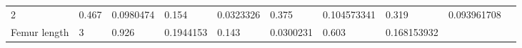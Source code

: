 \documentclass[11pt]{article}
\begin{document}
\begin{longtable}[]{@{}llllllllll@{}}
\begin{minipage}[t]{0.07\columnwidth}
2\strut
\end{minipage} & \begin{minipage}[t]{0.07\columnwidth}\raggedright
0.467\strut
\end{minipage} & \begin{minipage}[t]{0.07\columnwidth}\raggedright
0.0980474\strut
\end{minipage} & \begin{minipage}[t]{0.07\columnwidth}\raggedright
0.154\strut
\end{minipage} & \begin{minipage}[t]{0.07\columnwidth}\raggedright
0.0323326\strut
\end{minipage} & \begin{minipage}[t]{0.07\columnwidth}\raggedright
0.375\strut
\end{minipage} & \begin{minipage}[t]{0.07\columnwidth}\raggedright
0.104573341\strut
\end{minipage} & \begin{minipage}[t]{0.07\columnwidth}\raggedright
0.319\strut
\end{minipage} & \begin{minipage}[t]{0.07\columnwidth}\raggedright
0.093961708\strut
\end{minipage}\tabularnewline
\begin{minipage}[t]{0.07\columnwidth}\raggedright
Femur length\strut
\end{minipage} & \begin{minipage}[t]{0.07\columnwidth}\raggedright
3\strut
\end{minipage} & \begin{minipage}[t]{0.07\columnwidth}\raggedright
0.926\strut
\end{minipage} & \begin{minipage}[t]{0.07\columnwidth}\raggedright
0.1944153\strut
\end{minipage} & \begin{minipage}[t]{0.07\columnwidth}\raggedright
0.143\strut
\end{minipage} & \begin{minipage}[t]{0.07\columnwidth}\raggedright
0.0300231\strut
\end{minipage} & \begin{minipage}[t]{0.07\columnwidth}\raggedright
0.603\strut
\end{minipage} & \begin{minipage}[t]{0.07\columnwidth}\raggedright
0.168153932\strut

\end{minipage}
\end{longtable}
\end{document}
